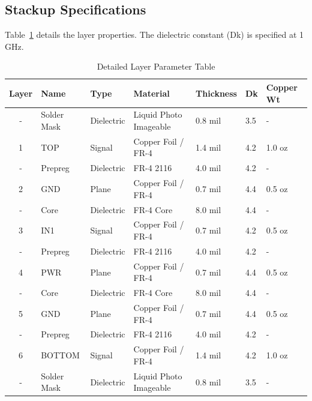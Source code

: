 \subsection{Stackup Specifications}
Table~\ref{tab:stackup} details the layer properties. The dielectric constant (Dk) is specified at 1 GHz.

\begin{table}[h]
\centering
\fontsize{9}{11}\selectfont
\begin{tabularx}{\textwidth}{c l l p{3.0cm} l l l}
\rowcolor{primary}
\color{white}\textbf{Layer} & \color{white}\textbf{Name} & \color{white}\textbf{Type} & \color{white}\textbf{Material} & \color{white}\textbf{Thickness} & \color{white}\textbf{Dk} & \color{white}\textbf{Copper Wt} \\
\midrule
- & Solder Mask & Dielectric & Liquid Photo Imageable & 0.8 mil & 3.5 & - \\
\rowcolor{lightbg}
1 & TOP & Signal & Copper Foil / FR-4 & 1.4 mil & 4.2 & 1.0 oz \\
- & Prepreg & Dielectric & FR-4 2116 & 4.0 mil & 4.2 & - \\
\rowcolor{lightbg}
2 & GND & Plane & Copper Foil / FR-4 & 0.7 mil & 4.4 & 0.5 oz \\
- & Core & Dielectric & FR-4 Core & 8.0 mil & 4.4 & - \\
\rowcolor{lightbg}
3 & IN1 & Signal & Copper Foil / FR-4 & 0.7 mil & 4.2 & 0.5 oz \\
- & Prepreg & Dielectric & FR-4 2116 & 4.0 mil & 4.2 & - \\
\rowcolor{lightbg}
4 & PWR & Plane & Copper Foil / FR-4 & 0.7 mil & 4.4 & 0.5 oz \\
- & Core & Dielectric & FR-4 Core & 8.0 mil & 4.4 & - \\
\rowcolor{lightbg}
5 & GND & Plane & Copper Foil / FR-4 & 0.7 mil & 4.4 & 0.5 oz \\
- & Prepreg & Dielectric & FR-4 2116 & 4.0 mil & 4.2 & - \\
\rowcolor{lightbg}
6 & BOTTOM & Signal & Copper Foil / FR-4 & 1.4 mil & 4.2 & 1.0 oz \\
- & Solder Mask & Dielectric & Liquid Photo Imageable & 0.8 mil & 3.5 & - \\
\bottomrule
\end{tabularx}
\caption{Detailed Layer Parameter Table}
\label{tab:stackup}
\end{table}

\newpage

